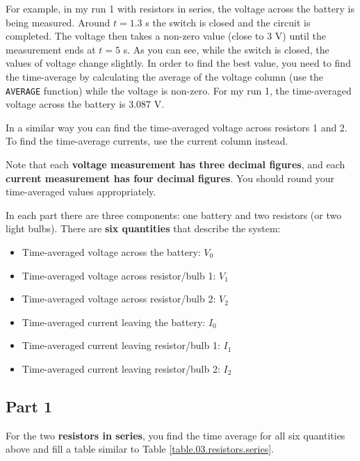 For example, in my run 1 with resistors in series, the voltage across the battery is being measured. Around $t = 1.3$ s the switch is closed and the circuit is completed. The voltage then takes a non-zero value (close to 3 V) until the measurement ends at $t = 5$ s. As you can see, while the switch is closed, the values of voltage change slightly. In order to find the best value, you need to find the time-average by calculating the average of the voltage column (use the \texttt{AVERAGE} function) while the voltage is non-zero. For my run 1, the time-averaged voltage across the battery is 3.087 V.

In a similar way you can find the time-averaged voltage across resistors 1 and 2. To find the time-average currents, use the current column instead.

Note that each \textbf{voltage measurement has three decimal figures}, and each \textbf{current measurement has four decimal figures}. You should round your time-averaged values appropriately.

In each part there are three components: one battery and two resistors (or two light bulbs). There are \textbf{six quantities} that describe the system:
\begin{itemize}
	\item Time-averaged voltage across the battery: $V_{0}$
	\item Time-averaged voltage across resistor/bulb 1: $V_{1}$
	\item Time-averaged voltage across resistor/bulb 2: $V_{2}$
	\item Time-averaged current leaving the battery: $I_{0}$
	\item Time-averaged current leaving resistor/bulb 1: $I_{1}$
	\item Time-averaged current leaving resistor/bulb 2: $I_{2}$
\end{itemize}
\subsection{Part 1}
For the two \textbf{resistors in series}, you find the time average for all six quantities above and fill a table similar to Table \ref{table.03.resistors.series}.

